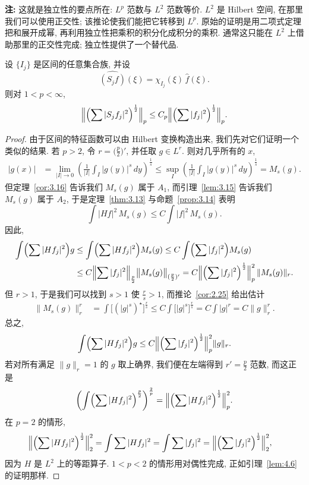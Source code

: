 \noindent\textbf{注:} 这就是独立性的要点所在: $L^p$ 范数与 $L^2$ 范数等价. $L^2$ 是 Hilbert 空间, 在那里我们可以使用正交性; 该推论使我们能把它转移到 $L^p$. 原始的证明是用二项式定理把和展开成幂, 再利用独立性把乘积的积分化成积分的乘积. 通常这只能在 $L^2$ 上借助那里的正交性完成; 独立性提供了一个替代品.

\begin{proposition}\label{prop:4.12}
设 $\{I_{j}\}$ 是区间的任意集合族, 并设
\[
\widehat{\left(S_{j}f\right)}(\xi)=\chi_{I_{j}}(\xi)\,\hat{f}(\xi).
\]
则对 $1<p<\infty$,
\[
\Bigl\|\Bigl(\sum|S_{j}f_{j}|^{2}\Bigr)^{\frac{1}{2}}\Bigr\|_{p}\leq C_{p}\Bigl\|\Bigl(\sum|f_{j}|^{2}\Bigr)^{\frac{1}{2}}\Bigr\|_{p}.
\]
\end{proposition}

\begin{proof}
由于区间的特征函数可以由 Hilbert 变换构造出来, 我们先对它们证明一个类似的结果. 若 $p>2$, 令 $r=\bigl(\frac{p}{2}\bigr)'$, 并任取 $g\in L^r$. 则对几乎所有的 $x$,
\begin{align*}
|g(x)|&=\lim_{|I|\to0}\left(\frac{1}{|I|}\int_{I}|g(y)|^{s}\,dy\right)^{\frac{1}{s}}
\leq\sup_{I}\left(\frac{1}{|I|}\int_{I}|g(y)|^{s}\,dy\right)^{\frac{1}{s}}=M_{s}(g).
\end{align*}
但定理~\ref{cor:3.16} 告诉我们 $M_{s}(g)$ 属于 $A_{1}$, 而引理~\ref{lem:3.15} 告诉我们 $M_{s}(g)$ 属于 $A_{2}$, 于是定理~\ref{thm:3.13} 与命题~\ref{prop:3.14} 表明
\[
\int|H f|^{2}\,M_{s}(g)\leq C\int|f|^{2}\,M_{s}(g).
\]
因此,
\begin{align*}
\int\Bigl(\sum|H f_{j}|^{2}\Bigr)g
&\leq\int\Bigl(\sum|H f_{j}|^{2}\Bigr)M_{s}(g)
\leq C\int\Bigl(\sum|f_{j}|^{2}\Bigr)M_{s}(g) \\
&\leq C\Bigl\|\sum|f_{j}|^{2}\Bigr\|_{\frac{p}{2}}\bigl\|M_{s}(g)\bigr\|_{(\frac{p}{2})'}
=C\Bigl\|\Bigl(\sum|f_{j}|^{2}\Bigr)^{\frac{1}{2}}\Bigr\|_{p}^{2}\,\|M_{s}(g)\|_{r}.
\end{align*}
但 $r>1$, 于是我们可以找到 $s>1$ 使 $\frac{r}{s}>1$, 而推论~\ref{cor:2.25} 给出估计
\begin{align*}
\|M_{s}(g)\|_{r}^{r}&=\int\bigl[(|g|^{s})^{\star}\bigr]^{\frac{r}{s}}
\leq C\int\bigl[|g|^{s}\bigr]^{\frac{r}{s}}=C\int|g|^{r}=C\|g\|_{r}^{r}.
\end{align*}
总之,
\[
\int\Bigl(\sum|H f_{j}|^{2}\Bigr)g\leq C\Bigl\|\Bigl(\sum|f_{j}|^{2}\Bigr)^{\frac{1}{2}}\Bigr\|_{p}^{2}\|g\|_{r}.
\]
若对所有满足 $\|g\|_r=1$ 的 $g$ 取上确界, 我们便在左端得到 $r'=\frac{p}{2}$ 范数, 而这正是
\[
\left(\int\Bigl(\sum|H f_{j}|^{2}\Bigr)^{\frac{p}{2}}\right)^{\frac{2}{p}}
=\Bigl\|\Bigl(\sum|H f_{j}|^{2}\Bigr)^{\frac{1}{2}}\Bigr\|_{p}^{2}.
\]
在 $p=2$ 的情形,
\begin{align*}
\Bigl\|\Bigl(\sum|H f_{j}|^{2}\Bigr)^{\frac{1}{2}}\Bigr\|_{2}^{2}
&=\int\sum|H f_{j}|^{2}=\int\sum|f_{j}|^{2}
=\Bigl\|\Bigl(\sum|f_{j}|^{2}\Bigr)^{\frac{1}{2}}\Bigr\|_{2}^{2},
\end{align*}
因为 $H$ 是 $L^{2}$ 上的等距算子. $1<p<2$ 的情形用对偶性完成, 正如引理~\ref{lem:4.6} 的证明那样.


\end{proof}
